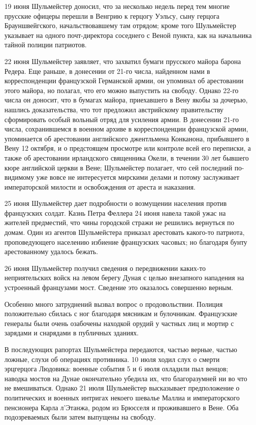 \documentclass[
  oneside,
  12pt,
  titlepage]{book}
\begin{document}
19 июня Шульмейстер доносил, что за несколько недель перед тем многие прусские офицеры перешли в Венгрию к герцогу Уэльсу, сыну герцога Брауншвейгского, начальствовавшему там отрядом; кроме того Шульмейстер указывает на одного почт-директора соседнего с Веной пункта, как на начальника тайной полиции патриотов.

22 июня Шульмейстер заявляет, что захватил бумаги прусского майора барона Редера. Еще раньше, в донесении от 21-го числа, найденном нами в корреспонденции французской Германской армии, он упоминал об арестовании этого майора, но полагал, что его можно выпустить на свободу. Однако 22-го числа он доносит, что в бумагах майора, приехавшего в Вену якобы за дочерью, нашлись доказательства, что тот предложил австрийскому правительству сформировать особый вольный отряд для усиления армии. В донесении 21-го числа, сохранившемся в военном архиве в корреспонденции французской армии, упоминается об арестовании английского джентльмена Конканона, прибывшего в Вену 12 октября, и о предстоящем просмотре или контроле всей его переписки, а также об арестовании ирландского священника Окели, в течении 30 лет бывшего кюре английской церкви в Вене; Шульмейстер полагает, что сей последний по-видимому уже вовсе не интересуется мирскими делами и потому заслуживает императорской милости и освобождения от ареста и наказания.

25 июня Шульмейстер дает подробности о возмущении населения против французских солдат. Казнь Петра Феллера 24 июня навела такой ужас на жителей предместий, что чины городской стражи не решились вернуться по домам. Один из агентов Шульмейстера приказал арестовать какого-то патриота, проповедующего населению избиение французских часовых; но благодаря бунту арестованному удалось бежать.

26 июня Шульмейстер получил сведения о передвижении каких-то неприятельских войск на левом берегу Дуная с целью внезапного нападения на устроенный французами мост. Сведение это оказалось совершенно верным.

Особенно много затруднений вызвал вопрос о продовольствии. Полиция положительно сбилась с ног благодаря мясникам и булочникам. Французские генералы были очень озабочены находкой орудий у частных лиц и мортир с зарядами и снарядами в публичных зданиях.

В последующих рапортах Шульмейстера передаются, частью верные, частью ложные, слухи об операциях противника. 10 июля ходил слух о смерти эрцгерцога Людовика: военные события 5 и 6 июля охладили пыл венцов; наводка мостов на Дунае окончательно убедила их, что благоразумней ни во что не вмешиваться. Однако 21 июля Шульмейстер высказывает предположение о политических и военных интригах некоего шевалье Маллиа и императорского пенсионера Карла л'Этанжа, родом из Брюсселя и проживавшего в Вене. Оба подозреваемых были затем выпущены на свободу.
\end{document}
